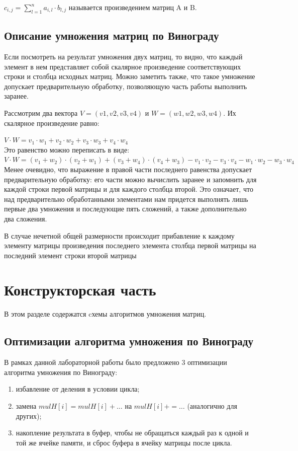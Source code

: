 \documentclass[12pt]{report}
\begin{document}
$c_{i,j} = \sum\limits_{l=1}^n a_{i,l}\cdot b_{l,j}$ называется произведением матриц A и B.

\section{Описание умножения матриц по Винограду}

Если посмотреть на результат умножения двух матриц, то видно, что каждый элемент в нем представляет собой скалярное произведение соответствующих строки и столбца исходных матриц. Можно заметить также, что такое умножение допускает предварительную обработку, позволяющую часть работы выполнить заранее.\vspace{\baselineskip}

Рассмотрим два вектора $V = (v1, v2, v3, v4)$ и $W = (w1, w2, w3, w4)$. Их скалярное произведение равно: 

$ V \cdot W=v_1 \cdot w_1 + v_2 \cdot w_2 + v_3 \cdot w_3 + v_4 \cdot w_4$ \\

Это равенство можно переписать в виде: \\
$V \cdot W=(v_1 + w_2) \cdot (v_2 + w_1) + (v_3 + w_4) \cdot (v_4 + w_3) - v_1 \cdot v_2 - v_3 \cdot v_4 - w_1 \cdot w_2 - w_3 \cdot w_4$\\

Менее очевидно, что выражение в правой части последнего равенства допускает предварительную обработку: его части можно вычислить заранее и запомнить для каждой строки первой матрицы и для каждого столбца второй. 
Это означает, что над предварительно обработанными элементами нам придется выполнять лишь первые два умножения и последующие пять сложений, а также дополнительно два сложения. 

В случае нечетной общей размерности происходит прибавление к каждому элементу матрицы произведения последнего элемента столбца первой матрицы на последний элемент строки второй матрицы



\chapter{Конструкторская часть}
В этом разделе содержатся cхемы алгоритмов умножения матриц.

\section{Оптимизации алгоритма умножения по Винограду}
В рамках данной лабораторной работы было предложено 3 оптимизации алгоритма умножения по Винограду:
\begin{enumerate}
	\item избавление от деления в условии цикла;
	\item замена $mulH[i] = mulH[i] + …$ на $mulH[i] += …$ (аналогично для других);
	\item накопление результата в буфер, чтобы не обращаться каждый раз к одной и той же ячейке памяти, и сброс буфера в ячейку матрицы после цикла.
\end{enumerate}
	
\end{document}
